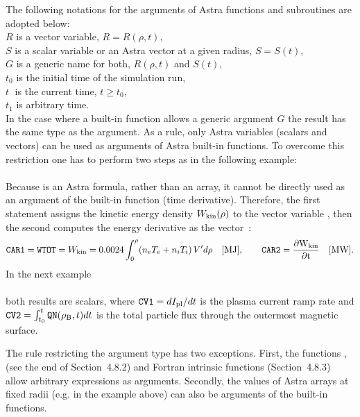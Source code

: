 The following notations for the arguments of Astra functions and
subroutines are adopted below:\\
\hspace*{1em}
$R$ is a vector variable, $R=R(\rho,t),$\\ \hspace*{1em}
$S$ is a scalar variable or an Astra vector at a given radius,
$S=S(t),$ \\ \hspace*{1em}
$G$ is a generic name for both, $R(\rho,t)$ and $S(t)$,\\ \hspace*{1em}
$t_0$ is the initial time of the simulation run,\\ \hspace*{1em}
$t\;$ is the current time, $t\geq t_0,$\\ \hspace*{1em}
$t_1$ is arbitrary time.\\
In the case where a built-in function allows a generic argument $G$ the
result has the same type as the argument. 
As a rule, only Astra variables (scalars and vectors) can be used as
arguments of Astra built-in functions.
To overcome this restriction one has to perform two steps as
in the following example:
\\ \indent
{}
\\
Because  is an Astra formula, rather than an array, it cannot
be directly used as an argument of the built-in function 
(time derivative).
Therefore, the first statement assigns the kinetic energy density 
$W_{\rm kin}(\rho)$ to the vector variable , 
then the second computes the energy derivative as the vector~:
$$
{\tt CAR1}={\tt WTOT}=W_{\rm kin}
=0.0024\int_0^{\rho}\!\left(n_eT_e+n_iT_i\right)V'd\rho
\quad\rm[MJ]
,\qquad
{\tt CAR2}=\displaystyle{\partial W_{\rm kin}\over\partial t}
\quad\rm[MW].
$$
In the next example 
\\ \indent
{}
\\
both results are scalars, where ${{\tt CV1}=dI_{\rm pl}/dt}$
is the plasma current ramp rate and
${\tt CV2}=\int_{t_0}^t{\tt QN}(\rho_{\rm B},t)dt$ is
the total particle flux through the outermost magnetic surface.

The rule restricting the argument type has two exceptions.
First, the functions ,  (see the end of 
Section~4.8.2) and Fortran intrinsic functions (Section~4.8.3)
allow arbitrary expressions as arguments.
Secondly, the values of Astra arrays at fixed radii (e.g.  in
the example above) can also be arguments of the built-in functions.

